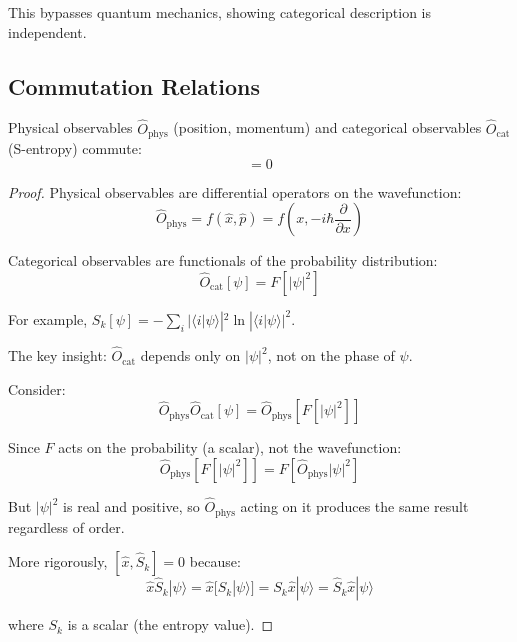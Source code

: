 This bypasses quantum mechanics, showing categorical description is independent.

\subsection{Commutation Relations}

\begin{proposition}
Physical observables $\hat{O}_{\text{phys}}$ (position, momentum) and categorical observables $\hat{O}_{\text{cat}}$ (S-entropy) commute:
\begin{equation}
[\hat{O}_{\text{phys}}, \hat{O}_{\text{cat}}] = 0
\end{equation}
\end{proposition}

\begin{proof}
Physical observables are differential operators on the wavefunction:
\begin{equation}
\hat{O}_{\text{phys}} = f(\hat{x}, \hat{p}) = f\left(x, -i\hbar\frac{\partial}{\partial x}\right)
\end{equation}

Categorical observables are functionals of the probability distribution:
\begin{equation}
\hat{O}_{\text{cat}}[\psi] = F[|\psi|^2]
\end{equation}

For example, $S_k[\psi] = -\sum_i |\langle i|\psi\rangle|^2 \ln|\langle i|\psi\rangle|^2$.

The key insight: $\hat{O}_{\text{cat}}$ depends only on $|\psi|^2$, not on the phase of $\psi$.

Consider:
\begin{equation}
\hat{O}_{\text{phys}}\hat{O}_{\text{cat}}[\psi] = \hat{O}_{\text{phys}}[F[|\psi|^2]]
\end{equation}

Since $F$ acts on the probability (a scalar), not the wavefunction:
\begin{equation}
\hat{O}_{\text{phys}}[F[|\psi|^2]] = F[\hat{O}_{\text{phys}}|\psi|^2]
\end{equation}

But $|\psi|^2$ is real and positive, so $\hat{O}_{\text{phys}}$ acting on it produces the same result regardless of order.

More rigorously, $[\hat{x}, \hat{S}_k] = 0$ because:
\begin{equation}
\hat{x}\hat{S}_k|\psi\rangle = \hat{x}[S_k|\psi\rangle] = S_k\hat{x}|\psi\rangle = \hat{S}_k\hat{x}|\psi\rangle
\end{equation}

where $S_k$ is a scalar (the entropy value).
\end{proof}

